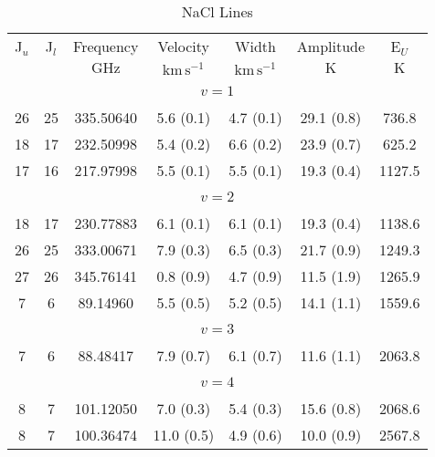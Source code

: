 \begin{table*}[htp]
\centering
\caption{NaCl Lines}
\begin{tabular}{ccccccc}
\label{tab:NaCl_salt_lines}
 J$_u$ & J$_l$ & Frequency & Velocity & Width & Amplitude & E$_U$ \\
  &  & $\mathrm{GHz}$ & $\mathrm{km\,s^{-1}}$ & $\mathrm{km\,s^{-1}}$ & $\mathrm{K}$ & $\mathrm{K}$ \\
\hline
&\vspace{-0.75em}\\
\multicolumn{7}{c}{$v = 1$} \\
\vspace{-0.75em}\\
 26 & 25 & 335.50640 & 5.6 (0.1) & 4.7 (0.1) & 29.1 (0.8) & 736.8 \\
 18 & 17 & 232.50998 & 5.4 (0.2) & 6.6 (0.2) & 23.9 (0.7) & 625.2 \\
 17 & 16 & 217.97998 & 5.5 (0.1) & 5.5 (0.1) & 19.3 (0.4) & 1127.5 \\
&\vspace{-0.75em}\\
\multicolumn{7}{c}{$v = 2$} \\
\vspace{-0.75em}\\
 18 & 17 & 230.77883 & 6.1 (0.1) & 6.1 (0.1) & 19.3 (0.4) & 1138.6 \\
 26 & 25 & 333.00671 & 7.9 (0.3) & 6.5 (0.3) & 21.7 (0.9) & 1249.3 \\
 27 & 26 & 345.76141 & 0.8 (0.9) & 4.7 (0.9) & 11.5 (1.9) & 1265.9 \\
 7 & 6 & 89.14960 & 5.5 (0.5) & 5.2 (0.5) & 14.1 (1.1) & 1559.6 \\
&\vspace{-0.75em}\\
\multicolumn{7}{c}{$v = 3$} \\
\vspace{-0.75em}\\
 7 & 6 & 88.48417 & 7.9 (0.7) & 6.1 (0.7) & 11.6 (1.1) & 2063.8 \\
&\vspace{-0.75em}\\
\multicolumn{7}{c}{$v = 4$} \\
\vspace{-0.75em}\\
 8 & 7 & 101.12050 & 7.0 (0.3) & 5.4 (0.3) & 15.6 (0.8) & 2068.6 \\
 8 & 7 & 100.36474 & 11.0 (0.5) & 4.9 (0.6) & 10.0 (0.9) & 2567.8 \\

\end{tabular}
\end{table*}
